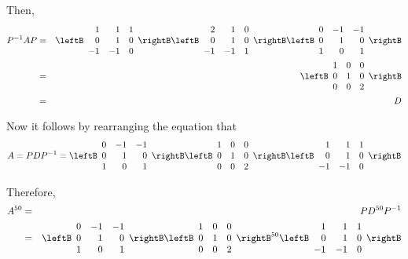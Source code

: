 \begin{solution}
Then, 
\begin{eqnarray*}
P^{-1}AP &=&\leftB
\begin{array}{rrr}
1 & 1 & 1 \\
0 & 1 & 0 \\
-1 & -1 & 0
\end{array}
\rightB \leftB 
\begin{array}{rrr}
2 & 1 & 0 \\
0 & 1 & 0 \\
-1 & -1 & 1
\end{array}
\rightB \leftB
\begin{array}{rrr}
0 & -1 & -1 \\
0 & 1 & 0 \\
1 & 0 & 1
\end{array}
\rightB \\
&=&\leftB
\begin{array}{rrr}
1 & 0 & 0 \\
0 & 1 & 0 \\
0 & 0 & 2
\end{array}
\rightB \\
&=& D
\end{eqnarray*}

Now it follows by rearranging the equation that
\begin{equation*}
A=PDP^{-1}=\leftB
\begin{array}{rrr}
0 & -1 & -1 \\
0 & 1 & 0 \\
1 & 0 & 1
\end{array}
\rightB \leftB
\begin{array}{rrr}
1 & 0 & 0 \\
0 & 1 & 0 \\
0 & 0 & 2
\end{array}
\rightB \leftB
\begin{array}{rrr}
1 & 1 & 1 \\
0 & 1 & 0 \\
-1 & -1 & 0
\end{array}
\rightB 
\end{equation*}

Therefore,
\begin{eqnarray*}
A^{50} &=&PD^{50}P^{-1} \\
&=&\leftB
\begin{array}{rrr}
0 & -1 & -1 \\
0 & 1 & 0 \\
1 & 0 & 1
\end{array}
\rightB \leftB
\begin{array}{rrr}
1 & 0 & 0 \\
0 & 1 & 0 \\
0 & 0 & 2
\end{array}
\rightB ^{50}\leftB
\begin{array}{rrr}
1 & 1 & 1 \\
0 & 1 & 0 \\
-1 & -1 & 0
\end{array}
\rightB 
\end{eqnarray*}


\end{solution}
